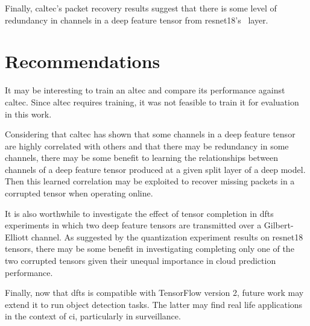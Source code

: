Finally, \gls{caltec}'s packet recovery results suggest that there is some level of redundancy in channels in a deep feature tensor from \gls{resnet18}'s \addone~layer. 



\section{Recommendations} \label{sec:reco}

It may be interesting to train an \gls{altec} and compare its performance against \gls{caltec}. Since \gls{altec} requires training, it was not feasible to train it for evaluation in this work. 

Considering that \gls{caltec} has shown that some channels in a deep feature tensor are highly correlated with others and that there may be redundancy in some channels, there may be some benefit to learning the relationships between channels of a deep feature tensor produced at a given split layer of a deep model. Then this learned correlation may be exploited to recover missing packets in a corrupted tensor when operating online.

It is also worthwhile to investigate the effect of tensor completion in \gls{dfts} experiments in which two deep feature tensors are transmitted over a Gilbert-Elliott channel. As suggested by the quantization experiment results on \gls{resnet18} tensors, there may be some benefit in investigating completing only one of the two corrupted tensors given their unequal importance in cloud prediction performance.

Finally, now that \gls{dfts} is compatible with TensorFlow version 2, future work may extend it to run object detection tasks. The latter may find real life applications in the context of \gls{ci}, particularly in surveillance.